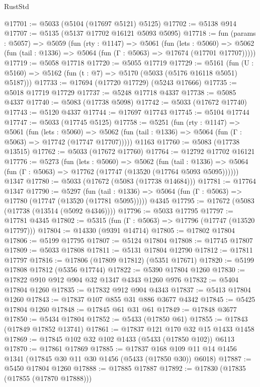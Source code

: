 \begin{lexlean}{RustStd}
\begin{coremodule}
@17701 := @5033 (@5104 (@17697 @5121) @5125)
@17702 := @5138 @914
@17707 := @5135 (@5137 @17702 @16121 @5093 @5095)
@17718 := fun (params : @5057) =>
  @5059
    (fun (rty : @1147) =>
    @5061
      (fun (lets : @5060) =>
      @5062 (fun (tail : @1336) => @5064 (fun (Γ : @5063) => @17674 (@17701 @17707)))))
@17719 := @5058 @17718
@17720 := @5055 @17719
@17729 := @5161
    (fun (U : @5160) => @5162 (fun (t : @7) => @5170 (@5033 (@5176 @16118 @5051) @5187)))
@17733 := @17694 (@17720 @17729) (@5243 @17666)
@17735 := @5018 @17719 @17729
@17737 := @5248 @17718 @4337
@17738 := @5085 @4337
@17740 := @5083 (@17738 @5098)
@17742 := @5033 (@17672 @17740)
@17743 := @5120 @4337
@17744 := @17697 @17743
@17745 := @5104 @17744
@17747 := @5033 (@17745 @5125)
@17758 := @5251
    (fun (rty : @1147) =>
    @5061
      (fun (lets : @5060) =>
      @5062 (fun (tail : @1336) => @5064 (fun (Γ : @5063) => @17742 (@17747 @17707)))))
    @1163
@17760 := @5083 (@17738 @13515)
@17762 := @5033 (@17672 @17760)
@17764 := @12792 @17702 @16121
@17776 := @5273
    (fun (lets : @5060) =>
    @5062
      (fun (tail : @1336) =>
      @5064 (fun (Γ : @5063) => @17762 (@17747 (@13520 (@17764 @5093 @5095))))))
    @1347
@17780 := @5033 (@17672 (@5083 (@17738 @14684)))
@17781 := @17764 @1347
@17790 := @5297
    (fun (tail : @1336) => @5064 (fun (Γ : @5063) => @17780 (@17747 (@13520 (@17781 @5095)))))
    @4345
@17795 := @17672 (@5083 (@17738 (@13514 (@5092 @4346))))
@17796 := @5033 @17795
@17797 := @17781 @4345
@17802 := @5315 (fun (Γ : @5063) => @17796 (@17747 (@13520 @17797)))
@17804 := @14330 (@9391 @14714)
@17805 := @17802 @17804
@17806 := @5199 @17795
@17807 := @5124 @17804
@17808 := @17745 @17807
@17809 := @5033 @17808
@17811 := @5131 @17804 @12790
@17812 := @17811 @17797
@17816 := @17806 (@17809 @17812) (@5351 @17671)
@17820 := @5199 @17808 @17812 (@5356 @17744)
@17822 := @5390 @17804 @1260
@17830 := @17822 @910 @912 @904 @32 @1347 @4343 @1260 @976
@17832 := @5404 @17804 @1260
@17835 := @17832 @912 @904 @4343
@17837 := @5413 @17804 @1260
@17843 := @17837 @107 @855 @31 @886 @3677 @4342
@17845 := @5425 @17804 @1260
@17848 := @17845 @61 @31 @61
@17849 := @17848 @3677
@17850 := @5434 @17804
@17852 := @5433 (@17850 @61)
@17855 := @17843 (@17849 @17852 @13741)
@17861 := @17837 @121 @170 @32 @15 @1433 @1458
@17869 := @17845 @102 @32 @102 @1433 (@5433 (@17850 @102)) @6113
@17870 := @17861 @17869
@17885 := @17837 @168 @109 @11 @14 @1456 @1341 (@17845 @30 @11 @30 @1456 (@5433 (@17850 @30)) @6018)
@17887 := @5450 @17804 @1260
@17888 := @17885 @17887
@17892 := @17830 (@17835 (@17855 (@17870 @17888)))

\end{coremodule}
\end{lexlean}
